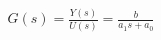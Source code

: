 \documentclass[preview]{standalone}
\begin{document}
\begin{align*}
G(s) = \frac{Y(s)}{U(s)} = \frac{b}{a_1 s + a_0}
\end{align*}
\end{document}
